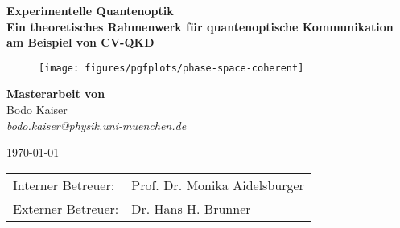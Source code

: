 \makeatletter
\begin{titlepage}
    \begin{otherlanguage}{ngerman}
		\begin{center}
			\large
			    \textbf{\textsf{Experimentelle Quantenoptik}}\\
		    \vspace{0.8em}
			\huge
		    \textbf{\textsf{Ein theoretisches Rahmenwerk für quantenoptische Kommunikation am Beispiel von CV-QKD}}\\
			
			\vspace{1.2em}
			\begin{figure}[htb]
				\centering
			    \texttt{[image: figures/pgfplots/phase-space-coherent]}
			\end{figure}
			
			\vspace{.6em}
		    \large
		    \textbf{Masterarbeit von}\\
			\vspace{.8em}
		    \large
			Bodo Kaiser\\
		    \vspace{.2em}
			\textit{bodo.kaiser@physik.uni-muenchen.de}
	
		    \large
		    \today
	
		    \vspace{1.9em}
			\normalsize
			\begin{tabular}{ll}
			Interner Betreuer: & Prof. Dr. Monika Aidelsburger \\
			Externer Betreuer: & Dr. Hans H. Brunner \\
			\end{tabular}
		\end{center}
    \end{otherlanguage}
\end{titlepage}
\makeatother